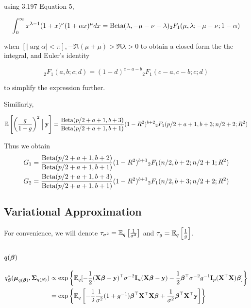 \documentclass{amsart}[12pt]
\theoremstyle{definition}
\begin{document}
using \cite{Gradshteyn1988} 3.197 Equation 5,

\[
	\int_0^\infty x^{\lambda-1} (1+x)^\nu (1 + \alpha x)^{\mu} dx = \text{Beta}(\lambda, -\mu-\nu-\lambda) {}_2 F_1 (\mu, \lambda; -\mu-\nu; 1 - \alpha)
\]

when $[|\arg \alpha| < \pi], -\Re(\mu + \mu) > \Re \lambda > 0$ to obtain a closed form the the integral,  and
Euler's identity

\[
	{}_2 F_1(a, b; c; d) = (1 - d)^{c - a -  b} {}_2 F_1(c - a, c - b; c; d)
\]

to simplify the expression further.

Similiarly,

\[
	\mathbb{E}\left[ \left(\frac{g}{1 + g} \right)^2 \Bigm| {\bf y} \right] = \frac{\text{Beta}(p/2 + a + 1, b + 3)}{\text{Beta}(p /2 + a + 1, b + 1)} (1 - R^2)^{b+2} {}_2 F_1(p/2 + a + 1, b + 3; n/2 + 2; R^2)
\]

Thus we obtain
\begin{align*}
	G_1 & = \frac{\text{Beta}(p/2 + a + 1, b + 2)}{\text{Beta}(p /2 + a + 1, b + 1)} (1 - R^2)^{b+1} {}_2 F_1(n/2, b + 2; n/2 + 1; R^2) \\
	G_2 & = \frac{\text{Beta}(p/2 + a + 1, b + 3)}{\text{Beta}(p /2 + a + 1, b + 1)} (1 - R^2)^{b+1} {}_2 F_1(n/2, b + 3; n/2 + 2; R^2) 
\end{align*}


\subsection{Variational Approximation}

For convenience, we will denote $\tau_{\sigma^2} = \mathbb{E}_q \left[ \frac{1}{\sigma^2} \right]$ and $\tau_{g} =
\mathbb{E}_q \left[ \frac{1}{g} \right]$.

\subsection{$q({\boldsymbol \beta})$}

\begin{align*}
	q_{\boldsymbol \beta}^*({\boldsymbol \mu}_{q({\boldsymbol \beta})}, {\boldsymbol \Sigma}_{q({\boldsymbol \beta})}) & \propto \exp \left \{ \mathbb{E}_q[-\frac{1}{2} ({\bf X} {\boldsymbol \beta} - {\bf y})^\top \sigma^{-2} {\bf I}_n ({\bf X} {\boldsymbol \beta} - {\bf y}) - \frac{1}{2} {\boldsymbol \beta}^\top \sigma^{-2} g^{-1} {\bf I}_p ({\bf X}^\top {\bf X}) {\boldsymbol \beta}] \right \} \\
	                                                  & = \exp \left \{ \mathbb{E}_q \left[-\frac{1}{2} \frac{1}{\sigma^2} (1 + g^{-1}){\boldsymbol \beta}^\top {\bf X}^\top {\bf X} {\boldsymbol\beta} + \frac{1}{\sigma^2}{\boldsymbol \beta}^\top {\bf X}^\top {\bf y} \right] \right \}                    
\end{align*}
\end{document}
